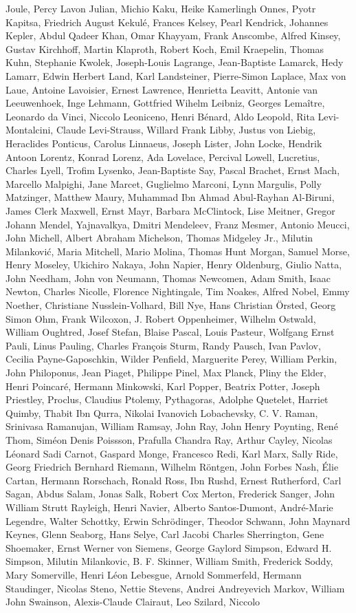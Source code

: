 \begin{spacing}{0.5}
\begin{tiny}
Joule, Percy Lavon Julian, Michio Kaku, Heike Kamerlingh Onnes, Pyotr Kapitsa, Friedrich August Kekulé, Frances Kelsey, Pearl Kendrick, Johannes Kepler, Abdul Qadeer Khan, Omar Khayyam, Frank Anscombe, Alfred Kinsey, Gustav Kirchhoff, Martin Klaproth, Robert Koch, Emil Kraepelin, Thomas Kuhn, Stephanie Kwolek, Joseph-Louis Lagrange,  Jean-Baptiste Lamarck, Hedy Lamarr, Edwin Herbert Land, Karl Landsteiner, Pierre-Simon Laplace, Max von Laue, Antoine Lavoisier, Ernest Lawrence, Henrietta Leavitt, Antonie van Leeuwenhoek, Inge Lehmann, Gottfried Wihelm Leibniz, Georges Lemaître, Leonardo da Vinci, Niccolo Leoniceno, Henri Bénard, Aldo Leopold, Rita Levi-Montalcini, Claude Levi-Strauss, Willard Frank Libby, Justus von Liebig, Heraclides Ponticus, Carolus Linnaeus, Joseph Lister, John Locke, Hendrik Antoon Lorentz, Konrad Lorenz, Ada Lovelace, Percival Lowell, Lucretius, Charles Lyell, Trofim Lysenko, Jean-Baptiste Say, Pascal Brachet, Ernst Mach, Marcello Malpighi, Jane Marcet, Guglielmo Marconi, Lynn Margulis, Polly Matzinger, Matthew Maury, Muhammad Ibn Ahmad Abul-Rayhan Al-Biruni, James Clerk Maxwell, Ernst Mayr, Barbara McClintock, Lise Meitner, Gregor Johann Mendel, Yajnavalkya, Dmitri Mendeleev, Franz Mesmer, Antonio Meucci, John Michell, Albert Abraham Michelson, Thomas Midgeley Jr., Milutin Milanković, Maria Mitchell, Mario Molina, Thomas Hunt Morgan, Samuel Morse, Henry Moseley, Ukichiro Nakaya, John Napier, Henry Oldenburg, Giulio Natta, John Needham, John von Neumann, Thomas Newcomen, Adam Smith, Isaac Newton, Charles Nicolle, Florence Nightingale, Tim Noakes, Alfred Nobel, Emmy Noether, Christiane Nusslein-Volhard, Bill Nye, Hans Christian Örsted, Georg Simon Ohm, Frank Wilcoxon, J. Robert Oppenheimer, Wilhelm Ostwald, William Oughtred, Josef Stefan, Blaise Pascal, Louis Pasteur, Wolfgang Ernst Pauli, Linus Pauling, Charles François Sturm, Randy Pausch, Ivan Pavlov, Cecilia Payne-Gaposchkin, Wilder Penfield, Marguerite Perey, William Perkin, John Philoponus, Jean Piaget, Philippe Pinel, Max Planck, Pliny the Elder, Henri Poincaré, Hermann Minkowski, Karl Popper, Beatrix Potter, Joseph Priestley, Proclus, Claudius Ptolemy, Pythagoras, Adolphe Quetelet, Harriet Quimby, Thabit Ibn Qurra, Nikolai Ivanovich Lobachevsky, C. V. Raman, Srinivasa Ramanujan, William Ramsay, John Ray, John Henry Poynting, René Thom, Siméon Denis Poissson, Prafulla Chandra Ray, Arthur Cayley, Nicolas Léonard Sadi Carnot, Gaspard Monge, Francesco Redi, Karl Marx, Sally Ride, Georg Friedrich Bernhard Riemann, Wilhelm Röntgen, John Forbes Nash, Élie Cartan, Hermann Rorschach, Ronald Ross, Ibn Rushd, Ernest Rutherford, Carl Sagan, Abdus Salam, Jonas Salk, Robert Cox Merton, Frederick Sanger, John William Strutt Rayleigh,  Henri Navier, Alberto Santos-Dumont, André-Marie Legendre, Walter Schottky, Erwin Schrödinger, Theodor Schwann, John Maynard Keynes, Glenn Seaborg, Hans Selye, Carl Jacobi Charles Sherrington, Gene Shoemaker, Ernst Werner von Siemens, George Gaylord Simpson, Edward H. Simpson, Milutin Milankovic, B. F. Skinner, William Smith, Frederick Soddy, Mary Somerville, Henri Léon Lebesgue, Arnold Sommerfeld, Hermann Staudinger, Nicolas Steno, Nettie Stevens, Andrei Andreyevich Markov, William John Swainson, Alexis-Claude Clairaut, Leo Szilard, Niccolo 
\end{tiny}
\end{spacing}
